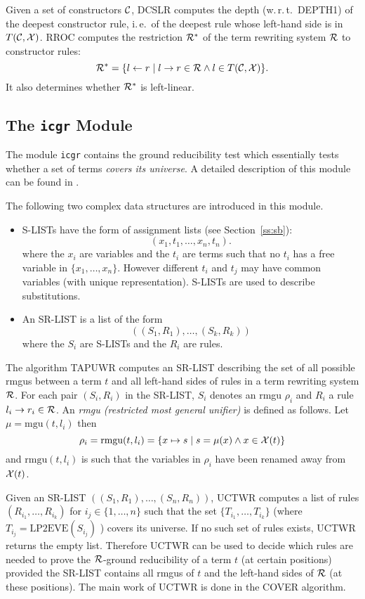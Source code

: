 Given a set of constructors $\cal C$, DCSLR computes the depth 
(w.\,r.\,t.\ DEPTH1) of the deepest constructor rule, i.\,e.\ of the 
deepest rule whose left-hand side is in $T({\cal C},{\cal X})$.
RROC computes the restriction ${\cal R}^*$ of the term rewriting system 
$\cal R$ to constructor rules:
\[ {\cal R}^* = \{ l \leftarrow r \mid l \rightarrow r \in {\cal R} 
    \wedge l \in T({\cal C},{\cal X}) \}.
\]
It also determines whether ${\cal R}^*$ is left-linear.

\subsection{The {\tt icgr} Module}

The module {\tt icgr} contains the ground reducibility test which 
essentially tests whether a set of terms {\em covers its universe}.
A detailed description of this module can be found in \cite{Buendgen:87}.

The following two complex data structures are introduced in this module.
\begin{itemize}
 \item S-LISTs have the form of assignment lists (see Section~\ref{ss:sb}):
    \[ (x_1, t_1, \ldots, x_n, t_n). \]
   where the $x_i$ are variables and the $t_i$ are terms such that no $t_i$ 
   has a free variable in $\{x_1, \ldots,x_n\}$.
   However different $t_i$ and $t_j$ may have common variables (with unique
   representation).
   S-LISTs are used to describe substitutions.
 \item An SR-LIST is a list of the form
   \[ ((S_1, R_1), \ldots, (S_k, R_k)) \]
   where the $S_i$ are S-LISTs and the $R_i$ are rules.
\end{itemize}

The algorithm TAPUWR computes an SR-LIST describing the set of all possible
rmgus between a term $t$ and all left-hand sides of rules in a term rewriting
system $\cal R$.
For each pair $(S_i, R_i)$ in the SR-LIST, $S_i$ denotes an rmgu $\rho_i$ and 
$R_i$ a rule \( l_i \rightarrow r_i \in {\cal R} \).
An {\em rmgu (restricted most general unifier)} is defined as follows.
Let \( \mu = \mbox{mgu}(t,l_i) \) then
\[ \rho_i = \mbox{rmgu}(t,l_i) = 
     \{ x \mapsto s \mid s = \mu(x) \wedge x \in {\cal X}(t) \}
\]
and $\mbox{rmgu}(t,l_i)$ is such that the variables in $\rho_i$ have been 
renamed away from ${\cal X}(t)$.

Given an SR-LIST $((S_1, R_1), \ldots, (S_n, R_n))$, UCTWR computes a list of
rules $(R_{i_1}, \ldots, R_{i_k})$ for \( i_j \in \{ 1, \ldots, n \} \) such
that the set $\{ T_{i_1}, \ldots, T_{i_k} \}$ 
(where \( T_{i_j}= \mbox{LP2EVE}(S_{i_j}) \) ) covers its universe.
If no such set of rules exists, UCTWR returns the empty list.
Therefore UCTWR can be used to decide which rules are needed to prove the
$\cal R$-ground reducibility of a term $t$ (at certain positions)
provided the SR-LIST contains all rmgus of $t$ and the left-hand sides of 
$\cal R$ (at these positions).
The main work of UCTWR is done in the COVER algorithm.

